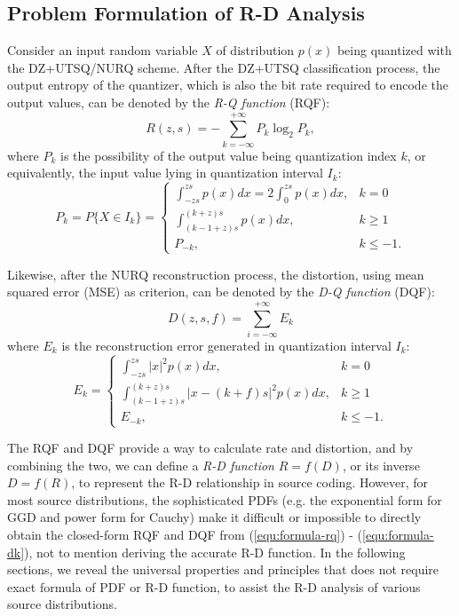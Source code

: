 \documentclass[smallabstract,smallcaptions]{dccpaper}
\begin{document}
\subsection{Problem Formulation of R-D Analysis}

Consider an input random variable $X$ of distribution $p(x)$ being quantized with the DZ+UTSQ/NURQ scheme. After the DZ+UTSQ classification process, the output entropy of the quantizer, which is also the bit rate required to encode the output values, can be denoted by the \emph{R-Q function} (RQF):
\begin{equation}\label{equ:formula-rq}
	R(z, s) = -\sum_{k=-\infty}^{+\infty} P_k \log_2 P_k ,
\end{equation}
where $P_k$ is the possibility of the output value being quantization index $k$, or equivalently, the input value lying in quantization interval $I_{k}$:
\begin{equation}\label{equ:formula-pk}
	P_k = P\{X \in I_k\} =
	\begin{cases}
		\int_{-z s}^{z s} p(x) dx
		= 2 \int_{0}^{z s} p(x) dx,
		& k=0 \\
		\int_{(k-1+z) s}^{(k+z) s} p(x) dx,
		& k \ge 1 \\
		P_{-k},
		& k \le -1 .
	\end{cases}
\end{equation}  

Likewise, after the NURQ reconstruction process, the distortion, using mean squared error (MSE) as criterion, can be denoted by the \emph{D-Q function} (DQF):
\begin{equation}\label{equ:formula-dq}
	D(z, s, f) =\sum_{i=-\infty}^{+\infty} E_k
\end{equation}
where $E_k$ is the reconstruction error generated in quantization interval $I_k$:
\begin{equation}\label{equ:formula-dk}
	E_k=
	\begin{cases}
		\int_{-z s}^{z s} |x|^2 p(x) dx,
		& k=0 \\
		\int_{(k-1+z) s}^{(k+z) s} |x - (k+f) s|^2 p(x) dx,
		& k \ge 1 \\
		E_{-k},
		& k \le -1 .
	\end{cases}
\end{equation}

The RQF and DQF provide a way to calculate rate and distortion, and by combining the two, we can define a \emph{R-D function} $R=f(D)$, or its inverse $D=f(R)$, to represent the R-D relationship in source coding. However, for most source distributions, the sophisticated PDFs (e.g. the exponential form for GGD and power form for Cauchy) make it difficult or impossible to directly obtain the closed-form RQF and DQF from (\ref{equ:formula-rq}) - (\ref{equ:formula-dk}), not to mention deriving the accurate R-D function. In the following sections, we reveal the universal properties and principles that does not require exact formula of PDF or R-D function, to assist the R-D analysis of various source distributions.
\end{document}
